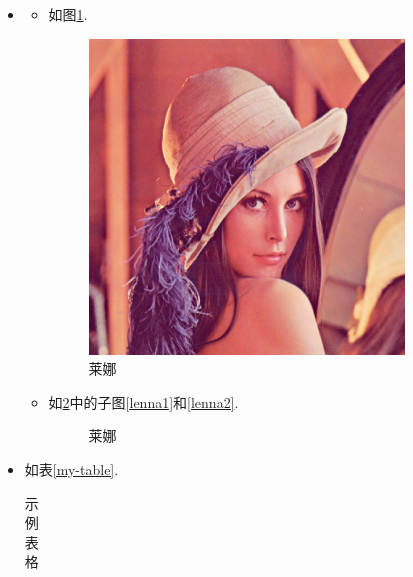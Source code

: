 \documentclass{assignment}
\begin{document}
    \begin{sol}
        \begin{itemize}
            \item[(1)]
            \begin{itemize}
                \item[(a)] 如图\ref{Lenna}.
                \begin{figure}[hbt!]
                    \centering
                    \includegraphics[width=.2\textwidth]{Lenna.jpg}
                    \caption{莱娜}
                    \label{Lenna}
                \end{figure}
                \item[(b)] 如\ref{Lenna2}中的子图\ref{lenna1}和\ref{lenna2}.
                \begin{figure}[hbt!]
                    \centering
                    \caption{莱娜}
                    \label{Lenna2}
                \end{figure}
            \end{itemize}
            \item[(2)] 如表\ref{my-table}.
            \begin{center}
                \begin{longtable}{ccccc}
                    \caption{示例表格}

\end{longtable}
\end{center}
\end{itemize}
\end{sol}
\end{document}
